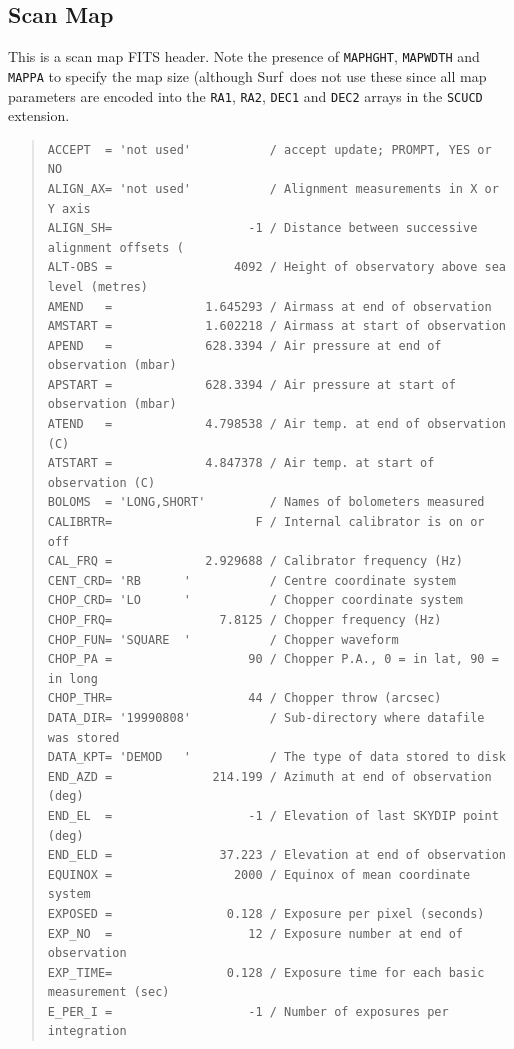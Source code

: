 \documentclass[twoside,11pt]{article}
\newenvironment{myquote}{\begin{quote}\begin{small}}{\end{small}\end{quote}}
\newcommand{\scusoft}          {{\sc Surf}}
\renewcommand{\_}{\texttt{\symbol{95}}}
\begin{document}
\subsection{Scan Map}

This is a scan map FITS header. Note the presence of \texttt{MAP\_HGHT},
\texttt{MAP\_WDTH} and \texttt{MAP\_PA} to specify the map size (although
\scusoft\ does not use these since all map parameters are encoded into the
\texttt{RA1}, \texttt{RA2}, \texttt{DEC1} and \texttt{DEC2} arrays in the
\texttt{SCUCD} extension.

\begin{myquote}
\begin{verbatim}
ACCEPT  = 'not used'           / accept update; PROMPT, YES or NO
ALIGN_AX= 'not used'           / Alignment measurements in X or Y axis
ALIGN_SH=                   -1 / Distance between successive alignment offsets (
ALT-OBS =                 4092 / Height of observatory above sea level (metres)
AMEND   =             1.645293 / Airmass at end of observation
AMSTART =             1.602218 / Airmass at start of observation
APEND   =             628.3394 / Air pressure at end of observation (mbar)
APSTART =             628.3394 / Air pressure at start of observation (mbar)
ATEND   =             4.798538 / Air temp. at end of observation (C)
ATSTART =             4.847378 / Air temp. at start of observation (C)
BOLOMS  = 'LONG,SHORT'         / Names of bolometers measured
CALIBRTR=                    F / Internal calibrator is on or off
CAL_FRQ =             2.929688 / Calibrator frequency (Hz)
CENT_CRD= 'RB      '           / Centre coordinate system
CHOP_CRD= 'LO      '           / Chopper coordinate system
CHOP_FRQ=               7.8125 / Chopper frequency (Hz)
CHOP_FUN= 'SQUARE  '           / Chopper waveform
CHOP_PA =                   90 / Chopper P.A., 0 = in lat, 90 = in long
CHOP_THR=                   44 / Chopper throw (arcsec)
DATA_DIR= '19990808'           / Sub-directory where datafile was stored
DATA_KPT= 'DEMOD   '           / The type of data stored to disk
END_AZD =              214.199 / Azimuth at end of observation (deg)
END_EL  =                   -1 / Elevation of last SKYDIP point (deg)
END_ELD =               37.223 / Elevation at end of observation
EQUINOX =                 2000 / Equinox of mean coordinate system
EXPOSED =                0.128 / Exposure per pixel (seconds)
EXP_NO  =                   12 / Exposure number at end of observation
EXP_TIME=                0.128 / Exposure time for each basic measurement (sec)
E_PER_I =                   -1 / Number of exposures per integration

\end{verbatim}
\end{myquote}
\end{document}
